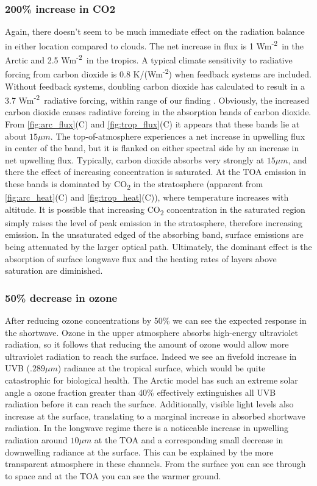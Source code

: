 \documentclass[twocol]{ametsoc}
\newcommand{\FU}{Wm\textsuperscript{-2}}
\begin{document}
\subsubsection{200\% increase in CO2}
Again, there doesn't seem to be much immediate effect on the radiation balance in either location compared to clouds. The net increase in flux is 1 \FU~in the Arctic and 2.5 \FU~in the tropics. A typical climate sensitivity to radiative forcing from carbon dioxide is 0.8 K/(\FU) when feedback systems are included. Without feedback systems, doubling carbon dioxide has calculated to result in a 3.7 \FU~radiative forcing, within range of our finding \citep{rahmstorf:2008}.
Obviously, the increased carbon dioxide causes radiative forcing in the absorption bands of carbon dioxide. From \autoref{fig:arc_flux}(C) and \autoref{fig:trop_flux}(C) it appears that these bands lie at about $15\mu m$. The top-of-atmosphere experiences a net increase in upwelling flux in center of the band, but it is flanked on either spectral side by an increase in net upwelling flux. Typically, carbon dioxide absorbs very strongly at $15\mu m$, and there the effect of increasing concentration is saturated. At the TOA emission in these bands is dominated by CO\textsubscript{2} in the stratosphere (apparent from \autoref{fig:arc_heat}(C) and \autoref{fig:trop_heat}(C)), where temperature increases with altitude. It is possible that increasing CO\textsubscript{2} concentration in the saturated region simply raises the level of peak emission in the stratosphere, therefore increasing emission. In the unsaturated edged of the absorbing band, surface emissions are being attenuated by the larger optical path. Ultimately, the dominant effect is the absorption of surface longwave flux and the heating rates of layers above saturation are diminished.

\subsubsection{50\% decrease in ozone}
After reducing ozone concentrations by 50\% we can see the expected response in the shortwave. Ozone in the upper atmosphere absorbs high-energy ultraviolet radiation, so it follows that reducing the amount of ozone would allow more ultraviolet radiation to reach the surface. Indeed we see an fivefold increase in UVB ($.289\mu m$) radiance at the tropical surface, which would be quite catastrophic for biological health. The Arctic model has such an extreme solar angle a ozone fraction greater than 40\% effectively extinguishes all UVB radiation before it can reach the surface. Additionally, visible light levels also increase at the surface, translating to a marginal increase in absorbed shortwave radiation. In the longwave regime there is a noticeable increase in upwelling radiation around $10\mu m$ at the TOA and a corresponding small decrease in downwelling radiance at the surface. This can be explained by the more transparent atmosphere in these channels. From the surface you can see through to space and at the TOA you can see the warmer ground.
\end{document}
